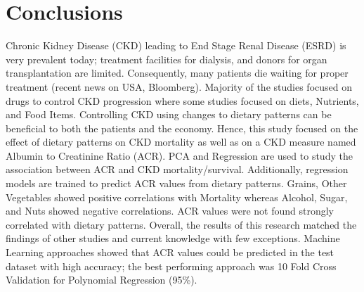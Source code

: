 \section{Conclusions}
Chronic Kidney Disease (CKD) leading to End Stage Renal Disease (ESRD) is very prevalent today; treatment facilities for dialysis, and donors for organ transplantation are limited. Consequently, many patients die waiting for  proper treatment (recent news on USA, Bloomberg). Majority of the studies focused on drugs to control CKD progression where some studies focused on diets, Nutrients, and Food Items. Controlling CKD using changes to dietary patterns can be beneficial to both the patients and the economy. Hence, this study focused on the effect of dietary patterns on CKD mortality as well as on a CKD measure named Albumin to Creatinine Ratio (ACR). PCA and Regression are used to study the association between ACR and CKD mortality/survival. Additionally, regression models are trained to predict ACR values from dietary patterns. Grains, Other Vegetables showed positive correlations with Mortality whereas Alcohol, Sugar, and Nuts showed negative correlations. ACR values were not found strongly correlated with dietary patterns. Overall, the results of this research matched the findings of other studies and current knowledge with few exceptions. Machine Learning approaches showed that ACR values could be predicted in the test dataset with high accuracy; the best performing approach was 10 Fold Cross Validation for Polynomial Regression (95\%).